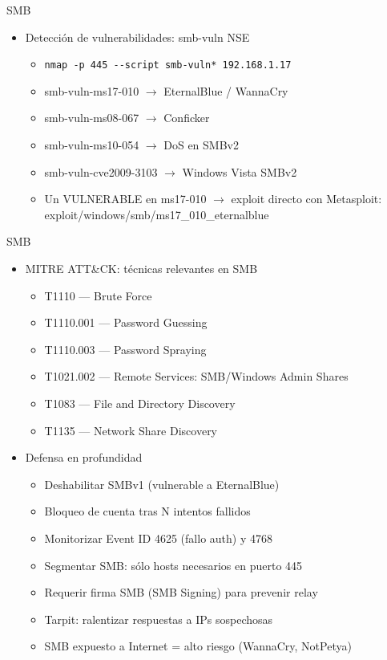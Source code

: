 \documentclass[aspectratio=169,11pt]{beamer}
\newcommand{\cmd}[1]{\texttt{#1}}
\begin{document}
\begin{frame}[allowframebreaks]{SMB}
\small
  \begin{itemize}
  \item Detección de vulnerabilidades: smb-vuln NSE
  \begin{itemize}
  \item \cmd{nmap -p 445 -{}-script smb-vuln* 192.168.1.17}
  \item smb-vuln-ms17-010 $\rightarrow$ EternalBlue / WannaCry
  \item smb-vuln-ms08-067 $\rightarrow$ Conficker
  \item smb-vuln-ms10-054 $\rightarrow$ DoS en SMBv2
  \item smb-vuln-cve2009-3103 $\rightarrow$ Windows Vista SMBv2
  \item Un VULNERABLE en ms17-010 $\rightarrow$ exploit directo con Metasploit: exploit/windows/smb/ms17\_010\_eternalblue
  \end{itemize}

\end{itemize}
\end{frame}

\begin{frame}[allowframebreaks]{SMB}
\small
  \begin{itemize}
  \item MITRE ATT\&CK: técnicas relevantes en SMB
    \begin{itemize}

  \item T1110 --- Brute Force
  \item T1110.001 --- Password Guessing
  \item T1110.003 --- Password Spraying
  \item T1021.002 --- Remote Services: SMB/Windows Admin Shares
  \item T1083 --- File and Directory Discovery
  \item T1135 --- Network Share Discovery
 
    \end{itemize}

  \item Defensa en profundidad
    \begin{itemize}

  \item Deshabilitar SMBv1 (vulnerable a EternalBlue)
  \item Bloqueo de cuenta tras N intentos fallidos
  \item Monitorizar Event ID 4625 (fallo auth) y 4768
  \item Segmentar SMB: sólo hosts necesarios en puerto 445
  \item Requerir firma SMB (SMB Signing) para prevenir relay
  \item Tarpit: ralentizar respuestas a IPs sospechosas
  \item SMB expuesto a Internet = alto riesgo (WannaCry, NotPetya)
    \end{itemize}

  \end{itemize}
\end{frame}
\end{document}
